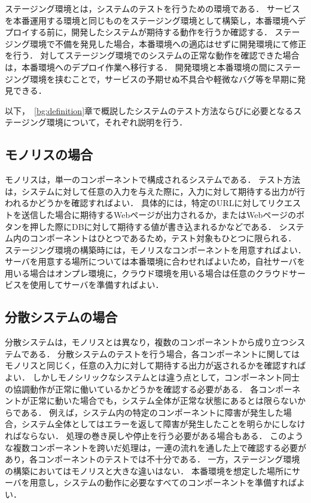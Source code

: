 ステージング環境とは，システムのテストを行うための環境である．
サービスを本番運用する環境と同じものをステージング環境として構築し，本番環境へデプロイする前に，開発したシステムが期待する動作を行うか確認する．
ステージング環境で不備を発見した場合，本番環境への適応はせずに開発環境にて修正を行う．
対してステージング環境でのシステムの正常な動作を確認できた場合は，本番環境へのデプロイ作業へ移行する．
開発環境と本番環境の間にステージング環境を挟むことで，サービスの予期せぬ不具合や軽微なバグ等を早期に発見できる．

以下，~\ref{bg:definition}章で概説したシステムのテスト方法ならびに必要となるステージング環境について，それぞれ説明を行う．

\subsection{モノリスの場合}
\label{bg:staging:monolith}

モノリスは，単一のコンポーネントで構成されるシステムである．
テスト方法は，システムに対して任意の入力を与えた際に，入力に対して期待する出力が行われるかどうかを確認すればよい．
具体的には，特定のURLに対してリクエストを送信した場合に期待するWebページが出力されるか，またはWebページのボタンを押した際にDBに対して期待する値が書き込まれるかなどである．
システム内のコンポーネントはひとつであるため，テスト対象もひとつに限られる．
ステージング環境の構築時には，モノリスなコンポーネントを用意すればよい．
サーバを用意する場所については本番環境に合わせればよいため，自社サーバを用いる場合はオンプレ環境に，クラウド環境を用いる場合は任意のクラウドサービスを使用してサーバを準備すればよい．

\subsection{分散システムの場合}
\label{bg:staging:distributed-system}

分散システムは，モノリスとは異なり，複数のコンポーネントから成り立つシステムである．
分散システムのテストを行う場合，各コンポーネントに関してはモノリスと同じく，任意の入力に対して期待する出力が返されるかを確認すればよい．
しかしモノシリックなシステムとは違う点として，コンポーネント同士の協調動作が正常に働いているかどうかを確認する必要がある．
各コンポーネントが正常に動いた場合でも，システム全体が正常な状態にあるとは限らないからである．
例えば，システム内の特定のコンポーネントに障害が発生した場合，システム全体としてはエラーを返して障害が発生したことを明らかにしなければならない．
処理の巻き戻しや停止を行う必要がある場合もある．
このような複数コンポーネントを跨いだ処理は，一連の流れを通した上で確認する必要があり，各コンポーネントのテストでは不十分である．
一方，ステージング環境の構築においてはモノリスと大きな違いはない．
本番環境を想定した場所にサーバを用意し，システムの動作に必要なすべてのコンポーネントを準備すればよい．

